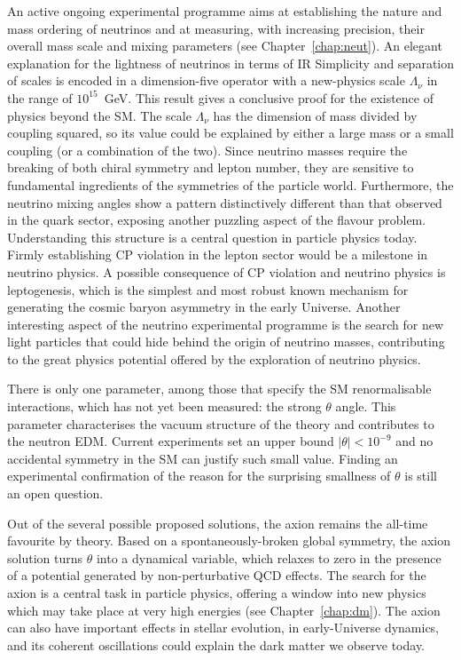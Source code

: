 \documentclass[../report.tex]{subfiles}
\begin{document}
An active ongoing experimental programme aims at establishing the nature and mass ordering of neutrinos and 
at measuring, with increasing precision, their overall mass scale and mixing parameters (see Chapter~\ref{chap:neut}). An elegant explanation for the lightness of neutrinos in terms of IR Simplicity and separation of scales is encoded in a dimension-five operator with a new-physics scale $\Lambda_\nu$ in the range of $10^{15}$~GeV. This result gives a conclusive proof for the existence of physics beyond the SM. The scale $\Lambda_\nu$ has the dimension of mass divided by coupling squared, so its value could be explained by either a large mass or a small coupling (or a combination of the two). Since neutrino masses require the breaking of both chiral symmetry and lepton number, they are sensitive to fundamental ingredients of the symmetries of the particle world. Furthermore, the neutrino mixing angles show a pattern distinctively different than that observed in the quark sector, exposing another puzzling aspect of the flavour problem. Understanding this structure is a central question in particle physics today. Firmly establishing CP violation in the lepton sector would be a milestone in neutrino physics. A possible consequence of CP violation and neutrino physics is leptogenesis, which is the simplest and most robust known mechanism for generating the cosmic baryon asymmetry in the early Universe. 
Another interesting aspect of the neutrino experimental programme is the search for new light particles that could hide behind the origin of neutrino masses, contributing to the great physics potential offered by the exploration of neutrino physics.

\medskip
{}

\smallskip
\noindent
There is only one parameter, among those that specify the SM renormalisable interactions, which has not yet been measured: the strong $\theta$ angle. This parameter characterises the vacuum structure of the theory and contributes to the neutron EDM. Current experiments set an upper bound 
$|\theta |< 10^{-9}$ and no accidental symmetry in the SM can justify such small value. Finding an experimental confirmation of the reason for the surprising smallness of $\theta$ is still an open question.

Out of the several possible proposed solutions, the axion remains the all-time favourite by theory. Based on a spontaneously-broken global symmetry, the axion solution turns $\theta$ into a dynamical variable, which relaxes to zero in the presence of a potential generated by non-perturbative QCD effects. The search for the axion is a central task in particle physics, offering a window into new physics which may take place at very high energies (see Chapter~\ref{chap:dm}). The axion can also have important effects in stellar evolution, in early-Universe dynamics, and its coherent oscillations could explain the dark matter we observe today.
\end{document}
